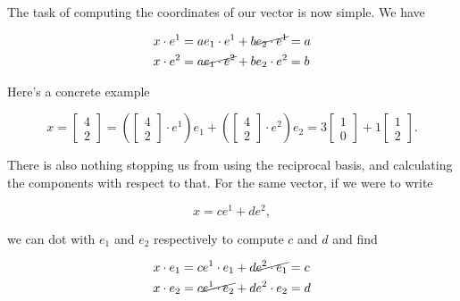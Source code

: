 The task of computing the coordinates of our vector is now simple.  We have

\begin{equation}\label{eqn:grahamSchmidtLorentz:340}
\begin{aligned}
x \cdot e^1 &= a e_1 \cdot e^1 + b \cancel{e_2 \cdot e^1} = a \\
x \cdot e^2 &= a \cancel{e_1 \cdot e^2} + b e_2 \cdot e^2 = b
\end{aligned}
\end{equation}

Here's a concrete example

\begin{equation}\label{eqn:grahamSchmidtLorentz:230}
x = 
\begin{bmatrix}
4 \\
2
\end{bmatrix} 
=
\left(
\begin{bmatrix}
4 \\
2
\end{bmatrix} 
\cdot e^1 
\right)
e_1
+
\left(
\begin{bmatrix}
4 \\
2
\end{bmatrix} 
\cdot e^2
\right)
e_2
= 3 
\begin{bmatrix}
1 \\
0
\end{bmatrix} 
+ 
1
\begin{bmatrix}
1 \\
2
\end{bmatrix}.
\end{equation}

There is also nothing stopping us from using the reciprocal basis, and calculating the components with respect to that.  For the same vector, if we were to write

\begin{equation}\label{eqn:grahamSchmidtLorentz:250}
x = c e^1 + d e^2,
\end{equation}

we can dot with $e_1$ and $e_2$ respectively to compute $c$ and $d$ and find

\begin{equation}\label{eqn:grahamSchmidtLorentz:360}
\begin{aligned}
x \cdot e_1 &= c e^1 \cdot e_1 + d \cancel{e^2 \cdot e_1} = c \\
x \cdot e_2 &= c \cancel{e^1 \cdot e_2} + d e^2 \cdot e_2 = d
\end{aligned}
\end{equation}

